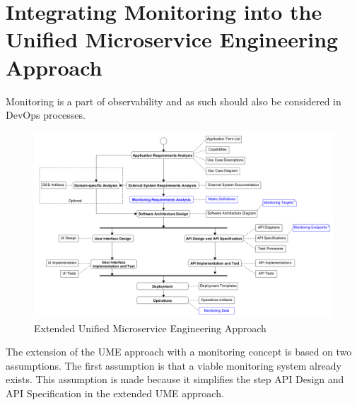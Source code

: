 



\section{Integrating Monitoring into the Unified Microservice Engineering Approach}


Monitoring is a part of observability and as such should also be considered in DevOps processes.


\begin{figure}[tb]
	\centering
	\includegraphics[width=\textwidth]{figures/ume_approach_extended.png}
	\caption{Extended Unified Microservice Engineering Approach}
	\label{fig:ume_approach_extended}
\end{figure}

The extension of the UME approach with a monitoring concept is based on two assumptions.
The first assumption is that a viable monitoring system already exists. This assumption
is made because it simplifies the step API Design and API Specification in the extended UME approach.


